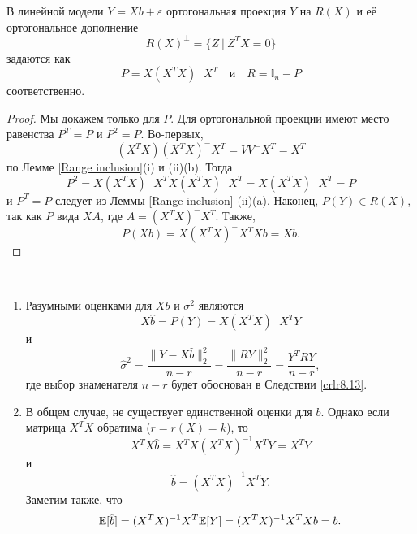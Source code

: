 \begin{thm}
	В линейной модели $Y = Xb + \varepsilon$ ортогональная проекция $Y$ на $R(X)$ и её ортогональное дополнение
	\[ R(X)^{\perp} = \{Z\ | \ Z^TX = 0 \}  \]
	задаются как
	\[P = X(X^T X)^- X^T \quad \text{и} \quad R = \mathbb{I}_n - P \]
	соответственно.
\end{thm}
\begin{proof}
	Мы докажем только для $P$. Для ортогональной проекции имеют место равенства $P^T = P$ и $P^2=P$. Во-первых,
	\[ (X^TX)(X^TX)^-X^T = VV^-X^T = X^T \]
	по Лемме \ref{Range inclusion}(i) и (ii)(b). Тогда
	\[ P^2 = X(X^TX)^-X^TX(X^TX)^-X^T = X(X^TX)^-X^T = P\]
	и $P^T = P$ следует из Леммы \ref{Range inclusion} (ii)(a).
	Наконец, $P(Y) \in R(X)$, так как $P$ вида $XA$, где $A = (X^TX)^-X^T$. Также,
	\[ P(Xb) = X(X^TX)^-X^TXb = Xb. \]
\end{proof}

\begin{rmrk} \label{rmrk8.10} \
	\begin{enumerate}
		\item Разумными оценками для $Xb$ и $\sigma^2$ являются
		\[ X\hat{b} = P(Y) = X(X^TX)^-X^TY  \]
		и
		\[ \hat{\sigma}^2 = \frac{\| Y - X\hat{b} \|_2^2}{n - r} = \frac{\| RY \|_2^2}{n - r} = \frac{Y^TRY}{n - r}, \]
		где выбор знаменателя $n-r$ будет обоснован в Следствии \ref{crlr8.13}.
		\item В общем случае, не существует единственной оценки для $b$. Однако если матрица $X^TX$ обратима ($r=r(X)=k$), то
		\[X^TX\hat{b} = X^TX(X^TX)^{-1}X^TY=X^TY  \]
		и
		\[ \hat{b} = (X^TX)^{-1}X^TY. \]
		Заметим также, что
		\[ \mathbb{E}[\hat{b}] = (X^TX)^{-1}X^T\mathbb{E}[Y] = (X^TX)^{-1}X^TXb = b. \]
	\end{enumerate}
\end{rmrk}

